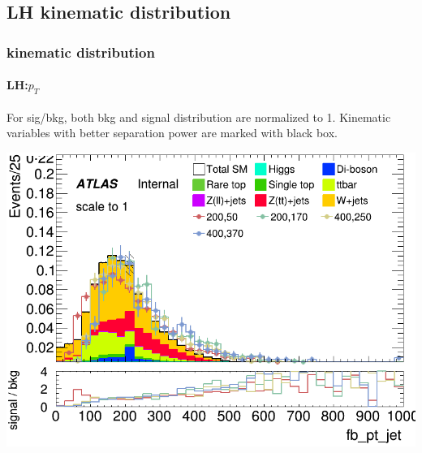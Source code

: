 \documentclass[usenames,dvipsnames]{beamer}
\begin{document}
\subsection{LH kinematic distribution}
\begin{frame}
	\frametitle{kinematic distribution}
	\framesubtitle{LH:$p_T$}
For sig/bkg, both bkg and signal distribution are normalized to 1. Kinematic variables with better separation power are marked with black box.

    \begin{minipage}{0.32\textwidth}
        \centering
        \includegraphics[width=\textwidth]{graphics/LH_met_sig/LH_fb_pt_jet_norm.png}
    \end{minipage}
    \hfill
    \begin{minipage}{0.32\textwidth}
        \centering
        \setlength{\fboxsep}{0pt} %
        \setlength{\fboxrule}{1pt} %

\end{minipage}
\end{frame}
\end{document}
